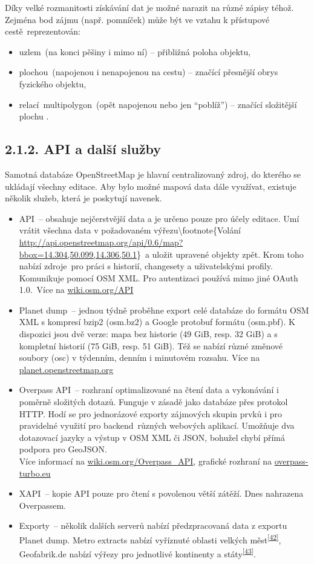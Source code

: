 Díky velké rozmanitosti získávání dat je možné narazit na různé zápisy téhož. Zejména bod zájmu (např. pomníček) může být ve vztahu k přístupové cestě~reprezentován:

\begin{itemize}
\tightlist
\item
  uzlem~(na konci pěšiny i mimo ní) -- přibližná poloha objektu,
\item
  plochou~(napojenou i nenapojenou na cestu) -- značící přesnější obrys fyzického objektu,
\item
  relací~multipolygon~(opět napojenou nebo jen ``poblíž'') -- značící složitější plochu .
\end{itemize}

\subsection{2.1.2. API a další služby}\label{api-a-dalux161uxed-sluux17eby}

Samotná databáze OpenStreetMap je hlavní centralizovaný zdroj, do kterého se ukládají všechny editace. Aby bylo možné mapová data dále využívat, existuje několik služeb, která je poskytují navenek.

\begin{itemize}
\tightlist
\item
  API~-- obsahuje nejčerstvější data a je určeno pouze pro účely editace. Umí vrátit všechna data v požadovaném výřezu\textbackslash{}footnote\{Volání \href{}{http://api.openstreetmap.org/api/0.6/map?bbox=14.304,50.099,14.306,50.1}\}~a uložit upravené objekty zpět. Krom toho nabízí zdroje~pro práci s historií, changesety a uživatelskými profily. Komunikuje pomocí OSM XML. Pro autentizaci používá mimo jiné OAuth 1.0.~Více na \href{}{wiki.osm.org/API}
\item
  Planet dump~-- jednou týdně proběhne export celé databáze do formátu OSM XML s kompresí bzip2 (osm.bz2) a Google protobuf formátu (osm.pbf). K dispozici jsou dvě verze: mapa bez historie (49 GiB, resp. 32 GiB) a s kompletní historií (75 GiB, resp. 51 GiB). Též se nabízí různé změnové soubory (osc) v týdenním, denním i minutovém rozsahu. Více na \href{}{planet.openstreetmap.org}
\item
  Overpass API~-- rozhraní optimalizované na čtení data a vykonávání i poměrně složitých dotazů. Funguje v zásadě jako databáze přes protokol HTTP. Hodí se pro jednorázové exporty zájmových skupin prvků i pro pravidelné využití pro backend~různých webových aplikací. Umožňuje dva dotazovací jazyky a výstup v OSM XML či JSON, bohužel chybí přímá podpora pro GeoJSON.\\
  Více informací na \href{}{wiki.osm.org/Overpass\_API}, grafické rozhraní na \href{}{overpass-turbo.eu}
\item
  XAPI~-- kopie API pouze pro čtení s povolenou větší zátěží. Dnes nahrazena Overpassem.
\item
  Exporty~-- několik dalších serverů nabízí předzpracovaná data z exportu Planet dump. Metro extracts nabízí vyříznuté oblasti velkých měst\textsuperscript{\href{}{{[}42{]}}}, Geofabrik.de nabízí výřezy pro jednotlivé kontinenty a státy\textsuperscript{\href{}{{[}43{]}}}.
\end{itemize}

